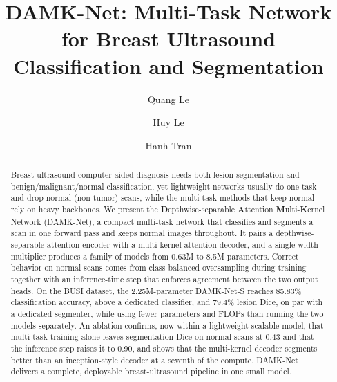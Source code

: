 \documentclass[runningheads]{llncs}
\begin{document}
%
\title{DAMK-Net: Multi-Task Network for Breast Ultrasound Classification and Segmentation}
%
\author{Quang Le \and Huy Le \and Hanh Tran}


%
\maketitle
%
\begin{abstract}
Breast ultrasound computer-aided diagnosis needs both lesion segmentation and
benign\slash malignant\slash normal classification, yet lightweight networks usually do one
task and drop normal (non-tumor) scans, while the multi-task methods that keep
normal rely on heavy backbones. We present the \textbf{D}epthwise-separable
\textbf{A}ttention \textbf{M}ulti-\textbf{K}ernel Network (DAMK-Net), a compact
multi-task network that classifies and segments a scan in one forward pass and
keeps normal images throughout. It pairs a depthwise-separable attention encoder with a
multi-kernel attention decoder, and a single width multiplier produces a family
of models from 0.63M to 8.5M parameters. Correct behavior on normal scans comes
from class-balanced oversampling during training together with an inference-time
step that enforces agreement between the two output heads. On the BUSI dataset,
the 2.25M-parameter DAMK-Net-S reaches 85.83\% classification accuracy, above a
dedicated classifier, and 79.4\% lesion Dice, on par with a dedicated segmenter,
while using fewer parameters and FLOPs than running the two models separately. An
ablation confirms, now within a lightweight scalable model, that multi-task
training alone leaves segmentation Dice on normal scans at 0.43 and that the
inference step raises it to 0.90, and shows that the multi-kernel decoder
segments better than an inception-style decoder at a seventh of the compute.
DAMK-Net delivers a complete, deployable breast-ultrasound pipeline in one small
model.

\end{abstract}
%
\end{document}
